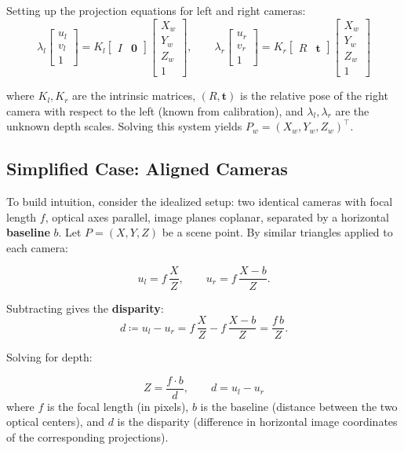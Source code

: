 \documentclass[11pt,a4paper]{article}
\theoremstyle{definition}
\theoremstyle{plain}
\theoremstyle{remark}
\newcommand{\p}[1]{\mathbf{#1}}             %
\begin{document}
Setting up the projection equations for left and right cameras:
\[
\lambda_l \begin{bmatrix} u_l \\ v_l \\ 1 \end{bmatrix} = K_l \begin{bmatrix} I & \mathbf{0} \end{bmatrix} \begin{bmatrix} X_w \\ Y_w \\ Z_w \\ 1 \end{bmatrix}, \qquad
\lambda_r \begin{bmatrix} u_r \\ v_r \\ 1 \end{bmatrix} = K_r \begin{bmatrix} R & \p{t} \end{bmatrix} \begin{bmatrix} X_w \\ Y_w \\ Z_w \\ 1 \end{bmatrix}
\]

where $K_l, K_r$ are the intrinsic matrices, $(R, \p{t})$ is the relative pose of the right camera with respect to the left (known from calibration), and $\lambda_l, \lambda_r$ are the unknown depth scales. Solving this system yields $P_w = (X_w, Y_w, Z_w)^\top$.

\subsection{Simplified Case: Aligned Cameras}

To build intuition, consider the idealized setup: two identical cameras with focal length $f$, optical axes parallel, image planes coplanar, separated by a horizontal \textbf{baseline} $b$. Let $P = (X, Y, Z)$ be a scene point. By similar triangles applied to each camera:

\[
u_l = f\,\frac{X}{Z}, \qquad u_r = f\,\frac{X - b}{Z}.
\]

Subtracting gives the \textbf{disparity}:
\[
d \coloneqq u_l - u_r = f\,\frac{X}{Z} - f\,\frac{X-b}{Z} = \frac{f\,b}{Z}.
\]

Solving for depth:

\begin{tcolorbox}[colback=blue!5!white,colframe=blue!75!black,title=\textbf{Depth from Disparity}]
\[
Z = \frac{f \cdot b}{d}, \qquad d = u_l - u_r
\]
where $f$ is the focal length (in pixels), $b$ is the baseline (distance between the two optical centers), and $d$ is the disparity (difference in horizontal image coordinates of the corresponding projections).
\end{tcolorbox}
\end{document}
